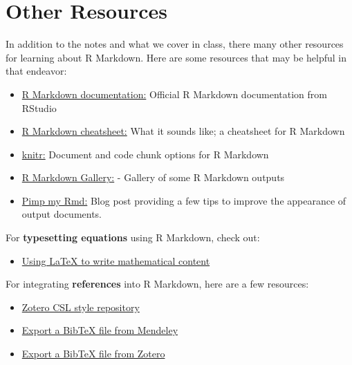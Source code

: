 \documentclass[]{book}
\providecommand{\tightlist}{%
  \setlength{\itemsep}{0pt}\setlength{\parskip}{0pt}}
\begin{document}
\hypertarget{other-resources}{%
\section{Other Resources}\label{other-resources}}

In addition to the notes and what we cover in class, there many other resources for learning about R Markdown. Here are some resources that may be helpful in that endeavor:

\begin{itemize}
\tightlist
\item
  \href{http://rmarkdown.rstudio.com/}{R Markdown documentation:} Official R Markdown documentation from RStudio
\item
  \href{https://www.rstudio.com/wp-content/uploads/2015/02/rmarkdown-cheatsheet.pdf}{R Markdown cheatsheet:} What it sounds like; a cheatsheet for R Markdown
\item
  \href{http://yihui.name/knitr/}{knitr:} Document and code chunk options for R Markdown
\item
  \href{https://rmarkdown.rstudio.com/gallery.html}{R Markdown Gallery:} - Gallery of some R Markdown outputs
\item
  \href{https://holtzy.github.io/Pimp-my-rmd/}{Pimp my Rmd:} Blog post providing a few tips to improve the appearance of output documents.
\end{itemize}

For \textbf{typesetting equations} using R Markdown, check out:

\begin{itemize}
\tightlist
\item
  \href{https://en.wikibooks.org/wiki/LaTeX/Mathematics}{Using LaTeX to write mathematical content}
\end{itemize}

For integrating \textbf{references} into R Markdown, here are a few resources:

\begin{itemize}
\tightlist
\item
  \href{https://www.zotero.org/styles}{Zotero CSL style repository}
\item
  \href{http://blog.mendeley.com/2012/03/24/how-to-series-generate-bibtex-files-for-your-collections-for-use-in-latex-part-3-of-12/}{Export a BibTeX file from Mendeley}
\item
  \href{http://libguides.mit.edu/c.php?g=176000\&p=1159208\#3}{Export a BibTeX file from Zotero}
\end{itemize}
\end{document}
